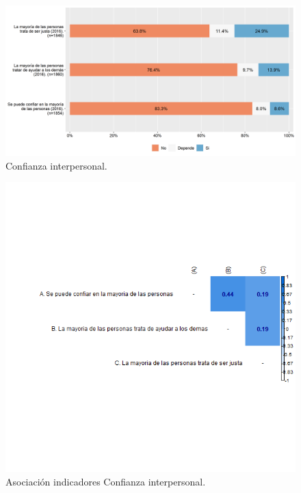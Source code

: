 \documentclass[
  12pt,
]{book}
\begin{document}
\begin{figure}[H]

{\centering \includegraphics[width=1\linewidth,height=1\textheight]{output/graphs/confianza-interpersonal} 

}

\caption{Confianza interpersonal.}\label{fig:confianza-interpersonal}
\end{figure}

\begin{figure}[H]

{\centering \includegraphics[width=1\linewidth,height=1\textheight]{output/graphs/confianza-interpersonal_cor} 

}

\caption{Asociación indicadores Confianza interpersonal.}\label{fig:confianza-interpersonal-cor}
\end{figure}
\end{document}
